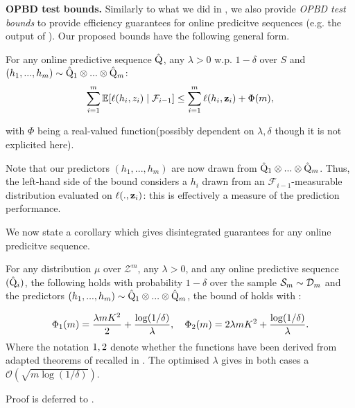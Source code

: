 \textbf{OPBD test bounds.}
Similarly to what we did in , we also provide \emph{OPBD test bounds} to provide efficiency guarantees for online predicitve sequences (e.g. the output of ). Our proposed bounds have the following general form.

For any online predictive sequence $\hat{\mathrm{Q}}$, any $\lambda>0$ w.p. $1-\delta$ over $S$ and $(h_1,...,h_{m})\sim \hat{\mathrm{Q}}_1\otimes...\otimes \hat{\mathrm{Q}}_{m}$:
\begin{align}
  \label{eq: OPBD_test_bound}
  \sum_{i=1}^m  \mathbb{E}[\ell(h_i,z_i) \mid \mathcal{F}_{i-1}]   \leq \sum_{i=1}^m  \ell(h_i,\mathbf{z}_i)   + \Phi(m),
\end{align}

with $\Phi$ being a real-valued function(possibly dependent on $\lambda,\delta$ though it is not explicited here).

Note that our predictors $(h_1,...,h_m)$ are now drawn from $\hat{\mathrm{Q}}_1\otimes...\otimes \hat{\mathrm{Q}}_{m}$. Thus, the left-hand side of the bound considers a $h_i$ drawn from an $\mathcal{F}_{i-1}$-measurable distribution evaluated on $\ell(.,\mathbf{z}_i)$: this is effectively a measure of the prediction performance.

We now state a corollary which gives disintegrated guarantees for any online predicitve sequence.

\begin{corollary}
  \label{cor: OPBD_test_bound}
  For any distribution $\mu$ over $\mathcal{Z}^m$, any $\lambda>0$, and any online predictive sequence $(\hat{\mathrm{Q}}_i)$, the following holds with probability $1-\delta$ over the sample $\mathcal{S}_m\sim\mathcal{D}_{m}$ and the predictors $(h_1,...,h_m)\sim \hat{\mathrm{Q}}_1\otimes...\otimes \hat{\mathrm{Q}}_m$, the bound of  holds with  :

  \begin{align*}
    \Phi_{\normalfont1}(m)= \frac{\lambda m K^2}{2} + \frac{\log(1/\delta)}{\lambda}, \quad \Phi_{\normalfont2}(m) = 2\lambda m K^2 + \frac{\log(1/\delta)}{\lambda}.
  \end{align*}
  Where the notation $\normalfont1, \normalfont2$ denote whether the functions have been derived from adapted theorems of \citealp{rivasplata2020pac,viallard2023general} recalled in . The optimised $\lambda$ gives in both cases a $\mathcal{O}(\sqrt{m\log(1/\delta)})$.
\end{corollary}

 Proof is deferred to .

